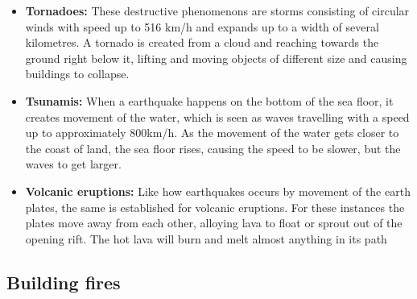 \begin{itemize}
    \item \textbf{Tornadoes:} These destructive phenomenons are storms consisting of circular winds with speed up to 516 km/h and expands up to a width of several kilometres. A tornado is created from a cloud and reaching towards the ground right below it, lifting and moving objects of different size and causing buildings to collapse.  \cite{SearchAndRescue:largest_tornadoes}
    \item \textbf{Tsunamis:} When a earthquake happens on the bottom of the sea floor, it creates movement of the water, which is seen as waves travelling with a speed up to approximately 800km/h. As the movement of the water gets closer to the coast of land, the sea floor rises, causing the speed to be slower, but the waves to get larger.  \cite{SearchAndRescue:Tsunami_facts}
    \item \textbf{Volcanic eruptions:} Like how earthquakes occurs by movement of the earth plates, the same is established for volcanic eruptions. For these instances the plates move away from each other, alloying lava to float or sprout out of the opening rift. The hot lava will burn and melt almost anything in its path
\end{itemize}



\subsection{Building fires} %





